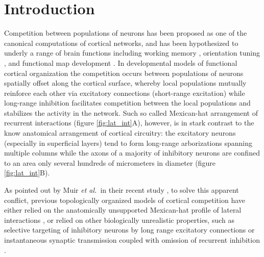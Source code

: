 \documentclass[utf8]{frontiersSCNS}
\newcommand{\etal}{\textit{et al.}}
\begin{document}


\section{Introduction}

Competition between populations of neurons has been proposed as one of the canonical computations of cortical 
networks, and has been hypothesized to underly a range of brain functions including working memory \citep{Amit1995,Durstewitz2000},
orientation tuning \citep{Somers1995,Ben-Yishai1995}, and functional map development \citep{VonderMalsburg1973,CMVC,Antolik2011}.
In developmental models of functional cortical organization the competition occurs between populations of neurons spatially offset 
along the cortical surface, whereby local populations mutually reinforce each other via excitatory connections (short-range 
excitation) while long-range inhibition facilitates competition between the local populations and stabilizes the activity in the 
network. Such so called Mexican-hat arrangement of recurrent interactions (figure \ref{fig:lat_int}A), however, is in stark contrast to the know anatomical arrangement
of cortical circuitry: the excitatory neurons (especially in superficial layers) tend to form long-range arborizations spanning 
multiple columns while the axons of a majority of inhibitory neurons are confined to an area only several hundreds of micrometers 
in diameter \citep{Buzas2006,Budd2001} (figure \ref{fig:lat_int}B). 


As pointed out by Muir \etal\, in their recent study \citep{Muir2014}, to solve this apparent conflict, previous topologically organized models of cortical competition have either relied on the anatomically unsupported 
Mexican-hat profile of lateral interactions \citep{VonderMalsburg1973,CMVC}, or relied on other biologically unrealistic properties, such as selective targeting of inhibitory neurons by long range excitatory 
connections \citep{law:phd09,Rutishauser2012} or instantaneous synaptic transmission coupled with omission of recurrent inhibition \citep{Kang2003,Levy2011,Grabska-Barwinska2008}. 
\end{document}
